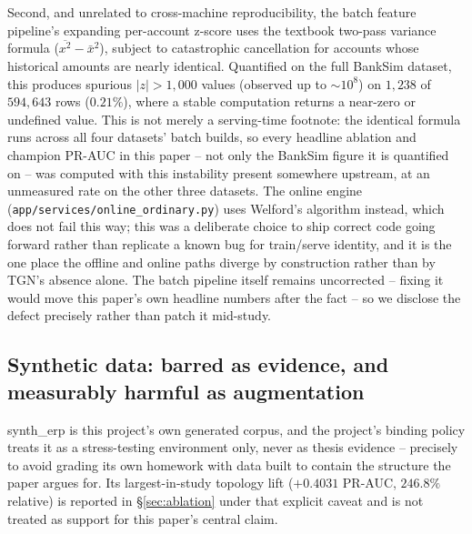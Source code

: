 Second, and unrelated to cross-machine reproducibility, the batch feature
pipeline's expanding per-account z-score uses the textbook two-pass variance
formula ($\overline{x^2} - \bar{x}^2$), subject to catastrophic cancellation
for accounts whose historical amounts are nearly identical. Quantified on the
full BankSim dataset, this produces spurious $|z|>1{,}000$ values (observed
up to $\sim\!10^8$) on $1{,}238$ of $594{,}643$ rows ($0.21\%$), where a
stable computation returns a near-zero or undefined value. This is not
merely a serving-time footnote: the identical formula runs across all four
datasets' batch builds, so every headline ablation and champion PR-AUC in
this paper -- not only the BankSim figure it is quantified on -- was computed
with this instability present somewhere upstream, at an unmeasured rate on
the other three datasets. The online engine
(\texttt{app/services/online\_ordinary.py}) uses Welford's algorithm
instead, which does not fail this way; this was a deliberate choice to ship
correct code going forward rather than replicate a known bug for train/serve
identity, and it is the one place the offline and online paths diverge by
construction rather than by TGN's absence alone. The batch pipeline itself
remains uncorrected -- fixing it would move this paper's own headline numbers
after the fact -- so we disclose the defect precisely rather than patch it
mid-study.

\subsection{Synthetic data: barred as evidence, and measurably harmful as augmentation}
synth\_erp is this project's own generated corpus, and the project's binding
policy treats it as a stress-testing environment only, never as thesis
evidence -- precisely to avoid grading its own homework with data built to
contain the structure the paper argues for. Its largest-in-study topology
lift ($+0.4031$ PR-AUC, $246.8\%$ relative) is reported in \S\ref{sec:ablation}
under that explicit caveat and is not treated as support for this paper's
central claim.

